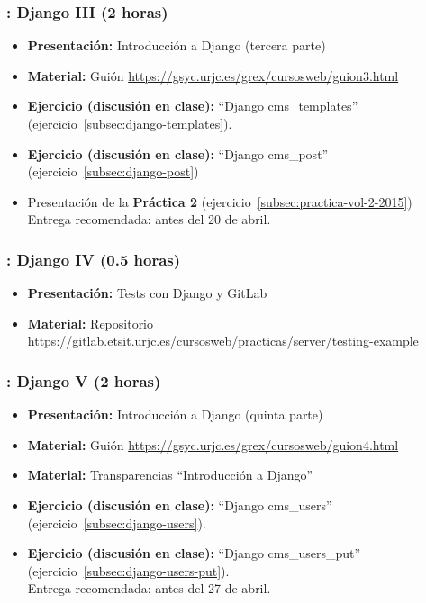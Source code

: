 \documentclass[a4paper,12pt]{article}
\begin{document}
\subsubsection{\martesJ: Django III (2 horas)}
\label{cal:martesJ}

\begin{itemize}
 \item \textbf{Presentación:} Introducción a Django (tercera parte)
  \item \textbf{Material:} Guión \url{https://gsyc.urjc.es/grex/cursosweb/guion3.html}
 \item \textbf{Ejercicio (discusión en clase):} ``Django cms\_templates'' (ejercicio~\ref{subsec:django-templates}).
 \item \textbf{Ejercicio (discusión en clase):} ``Django cms\_post'' (ejercicio~\ref{subsec:django-post}) \\
  \item Presentación de la \textbf{Práctica 2} (ejercicio~\ref{subsec:practica-vol-2-2015}) \\
  Entrega recomendada: antes del 20 de abril.
\end{itemize}

\subsubsection{\juevesI: Django IV (0.5 horas)}
\label{cal:juevesIc}

\begin{itemize}
 \item \textbf{Presentación:} Tests con Django y GitLab
  \item \textbf{Material:} Repositorio \url{https://gitlab.etsit.urjc.es/cursosweb/practicas/server/testing-example}
\end{itemize}


\subsubsection{\martesK: Django V (2 horas)}
\label{cal:martesK}

\begin{itemize}
 \item \textbf{Presentación:} Introducción a Django (quinta parte)
 \item \textbf{Material:} Guión \url{https://gsyc.urjc.es/grex/cursosweb/guion4.html}
 \item \textbf{Material:} Transparencias ``Introducción a Django''
 \item \textbf{Ejercicio (discusión en clase):} ``Django cms\_users'' (ejercicio~\ref{subsec:django-users}).
 \item \textbf{Ejercicio (discusión en clase):} ``Django cms\_users\_put'' (ejercicio~\ref{subsec:django-users-put}). \\
  Entrega recomendada: antes del 27 de abril.
\end{itemize}
\end{document}
